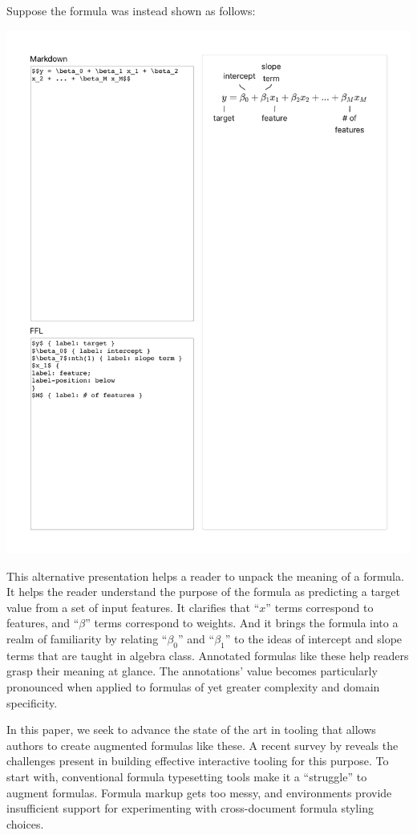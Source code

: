 Suppose the formula was instead shown as follows:

\begin{center}
\vspace{0.5ex}
\includegraphics[width=0.65\linewidth]{figures/aug-intro}
\vspace{0.5ex}
\end{center}

This alternative presentation helps a reader to unpack the meaning of a formula. It helps the reader understand the purpose of the formula as predicting a target value from a set of input features. It clarifies that ``$x$'' terms correspond to features, and ``$\beta$'' terms correspond to weights. And it brings the formula into a realm of familiarity by relating ``$\beta_0$'' and ``$\beta_1$'' to the ideas of intercept and slope terms that are taught in algebra class.
Annotated formulas like these help readers grasp their meaning at glance. The annotations' value becomes particularly pronounced when applied to formulas of yet greater complexity and domain specificity.

In this paper, we seek to advance the state of the art in tooling that allows authors to create augmented formulas like these. A recent survey by \citet{ref:head2022math} reveals the challenges present in building effective interactive tooling for this purpose. To start with, conventional formula typesetting tools make it a ``struggle'' to augment formulas. Formula markup gets too messy, and environments provide insufficient support for experimenting with cross-document formula styling choices.

